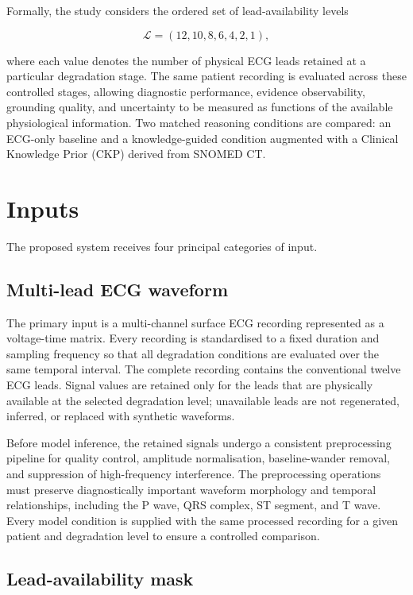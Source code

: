\documentclass{ssnreview}
\begin{document}
Formally, the study considers the ordered set of lead-availability levels

\begin{equation}
  \mathcal{L} = (12, 10, 8, 6, 4, 2, 1),
\end{equation}

where each value denotes the number of physical ECG leads retained at a particular
degradation stage. The same patient recording is evaluated across these controlled stages,
allowing diagnostic performance, evidence observability, grounding quality, and uncertainty
to be measured as functions of the available physiological information. Two matched
reasoning conditions are compared: an ECG-only baseline and a knowledge-guided condition
augmented with a Clinical Knowledge Prior (CKP) derived from SNOMED CT.

\section{Inputs}

The proposed system receives four principal categories of input.

\subsection{Multi-lead ECG waveform}

The primary input is a multi-channel surface ECG recording represented as a voltage-time
matrix. Every recording is standardised to a fixed duration and sampling frequency so that
all degradation conditions are evaluated over the same temporal interval. The complete
recording contains the conventional twelve ECG leads. Signal values are retained only for
the leads that are physically available at the selected degradation level; unavailable leads
are not regenerated, inferred, or replaced with synthetic waveforms.

Before model inference, the retained signals undergo a consistent preprocessing pipeline
for quality control, amplitude normalisation, baseline-wander removal, and suppression of
high-frequency interference. The preprocessing operations must preserve diagnostically
important waveform morphology and temporal relationships, including the P wave, QRS
complex, ST segment, and T wave. Every model condition is supplied with the same processed
recording for a given patient and degradation level to ensure a controlled comparison.

\subsection{Lead-availability mask}
\end{document}
